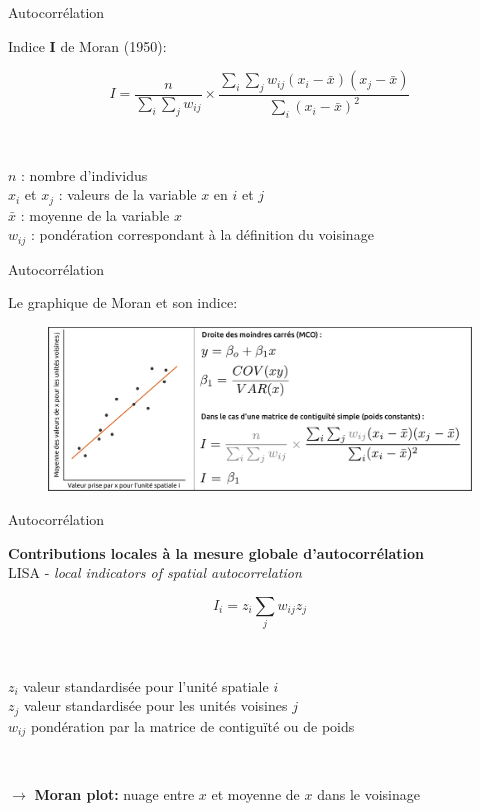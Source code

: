 \begin{frame}{Autocorrélation}

Indice \textbf{I} de Moran (1950):

$$
I = \frac{n}{\sum_{i} \sum_{j} w_{ij}} \times \frac{\sum_{i} \sum_{j} w_{ij} (x_i - \bar{x})(x_j - \bar{x})}{\sum_{i} (x_i - \bar{x})^2}
$$

~

$n$ : nombre d'individus \\ 
$x_i$ et $x_j$ : valeurs de la variable $x$ en $i$ et $j$ \\ 
$\bar{x}$ : moyenne de la variable $x$ \\ 
$w_{ij}$ : pondération correspondant à la définition du voisinage

\end{frame}



\begin{frame}{Autocorrélation}

Le graphique de Moran et son indice:

\begin{figure}
\includegraphics[width=12cm]{MoranPlot.pdf}
\end{figure}

\end{frame}


\begin{frame}{Autocorrélation}

\textbf{Contributions locales à la mesure globale d'autocorrélation} \\
LISA - \emph{local indicators of spatial autocorrelation}

$$
I_i = z_i \sum_{j} w_{ij} z_j
$$

~

$z_i$ valeur standardisée pour l'unité spatiale $i$ \\
$z_j$ valeur standardisée pour les unités voisines $j$ \\
$w_{ij}$ pondération par la matrice de contiguïté ou de poids

~

$\rightarrow$ \textbf{Moran plot:} nuage entre $x$ et moyenne de $x$ dans le voisinage

\end{frame}


